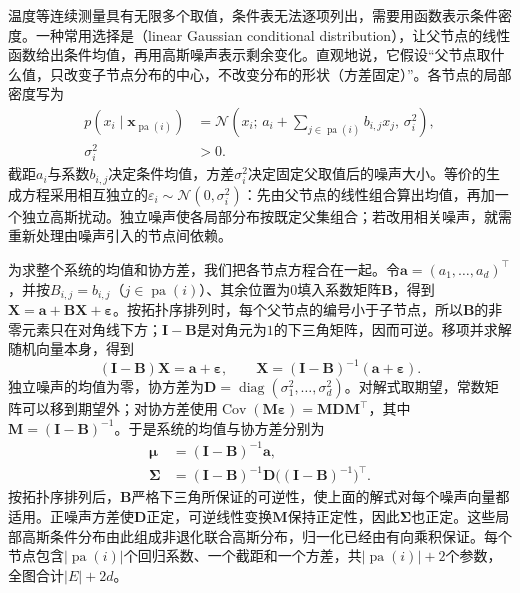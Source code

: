 温度等连续测量具有无限多个取值，条件表无法逐项列出，需要用函数表示条件密度。一种常用选择是（linear Gaussian conditional distribution），让父节点的线性函数给出条件均值，再用高斯噪声表示剩余变化。直观地说，它假设“父节点取什么值，只改变子节点分布的中心，不改变分布的形状（方差固定）”。各节点的局部密度写为
\begin{equation}
  \begin{aligned}
    p(x_i\mid\bm{x}_{\operatorname{pa}(i)})
      &=\mathcal N\left(
        x_i;\,a_i+\sum_{j\in\operatorname{pa}(i)}b_{i,j}x_j,\,
        \sigma_i^2\right),\\
    \sigma_i^2&>0.
  \end{aligned}
  \label{eq:pgm-directed-linear-gaussian}
\end{equation}
截距$a_i$与系数$b_{i,j}$决定条件均值，方差$\sigma_i^2$决定固定父取值后的噪声大小。等价的生成方程采用相互独立的$\varepsilon_i\sim\mathcal N(0,\sigma_i^2)$：先由父节点的线性组合算出均值，再加一个独立高斯扰动。独立噪声使各局部分布按既定父集组合；若改用相关噪声，就需重新处理由噪声引入的节点间依赖。

为求整个系统的均值和协方差，我们把各节点方程合在一起。令$\bm a=(a_1,\ldots,a_d)^{\top}$，并按$B_{i,j}=b_{i,j}$（$j\in\operatorname{pa}(i)$）、其余位置为$0$填入系数矩阵$\bm B$，得到$\bm X=\bm a+\bm B\bm X+\bm\varepsilon$。按拓扑序排列时，每个父节点的编号小于子节点，所以$\bm B$的非零元素只在对角线下方；$\bm I-\bm B$是对角元为$1$的下三角矩阵，因而可逆。移项并求解随机向量本身，得到
\[
  (\bm I-\bm B)\bm X=\bm a+\bm\varepsilon,
  \qquad
  \bm X=(\bm I-\bm B)^{-1}(\bm a+\bm\varepsilon).
\]
独立噪声的均值为零，协方差为$\bm D=\operatorname{diag}(\sigma_1^2,\ldots,\sigma_d^2)$。对解式取期望，常数矩阵可以移到期望外；对协方差使用$\operatorname{Cov}(\bm M\bm\varepsilon)=\bm M\bm D\bm M^{\top}$，其中$\bm M=(\bm I-\bm B)^{-1}$。于是系统的均值与协方差分别为
\[
  \begin{aligned}
    \bm{\mu}&=(\bm I-\bm B)^{-1}\bm a,\\
    \bm{\Sigma}&=(\bm I-\bm B)^{-1}
      \bm D\bigl((\bm I-\bm B)^{-1}\bigr)^{\top}.
  \end{aligned}
\]
按拓扑序排列后，$\bm B$严格下三角所保证的可逆性，使上面的解式对每个噪声向量都适用。正噪声方差使$\bm D$正定，可逆线性变换$\bm M$保持正定性，因此$\bm\Sigma$也正定。这些局部高斯条件分布由此组成非退化联合高斯分布，归一化已经由有向乘积保证。每个节点包含$|\operatorname{pa}(i)|$个回归系数、一个截距和一个方差，共$|\operatorname{pa}(i)|+2$个参数，全图合计$|E|+2d$。

